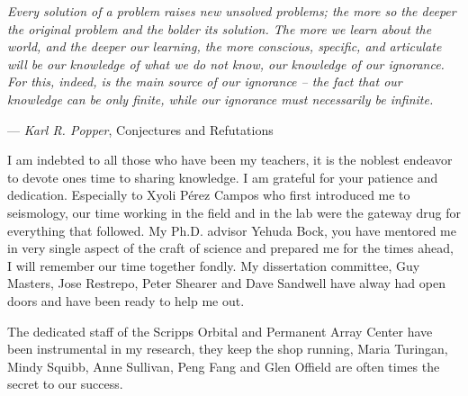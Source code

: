 \begin{frontmatter}
 \begin{myepigraph} %
 \vfil
\noindent
\emph{Every solution of a problem raises new unsolved problems; the more so the deeper the original problem and the bolder its solution. The more we learn about the world, and the deeper our learning, the more conscious, specific, and articulate will be our knowledge of what we do not know, our knowledge of our ignorance. For this, indeed, is the main source of our ignorance -- the fact that our knowledge can be only finite, while our ignorance must necessarily be infinite.}
 \vspace{10mm}
 
 
\begin{raggedright}
\hfill --- \emph{Karl R. Popper}, Conjectures and Refutations
\end{raggedright}
 \end{myepigraph}


%
\tableofcontents
\listoffigures  %
\listoftables   %



%
%
\begin{acknowledgements}
I am indebted to all those who have been my teachers, it is the noblest endeavor to devote ones time to sharing knowledge. I am grateful for your patience and dedication. Especially to Xyoli P\'erez Campos who first introduced me to seismology, our time working in the field and in the lab were the gateway drug for everything that followed. My Ph.D. advisor Yehuda Bock, you have mentored me in very single aspect of the craft of science and prepared me for the times ahead, I will remember our time together fondly. My dissertation committee, Guy Masters, Jose Restrepo, Peter Shearer and Dave Sandwell have alway had open doors and have been ready to help me out.

The dedicated staff of the Scripps Orbital and Permanent Array Center have been instrumental in my research, they keep the shop running, Maria Turingan, Mindy Squibb, Anne Sullivan, Peng Fang and Glen Offield are often times the secret to our success.


\end{acknowledgements}
\end{frontmatter}

